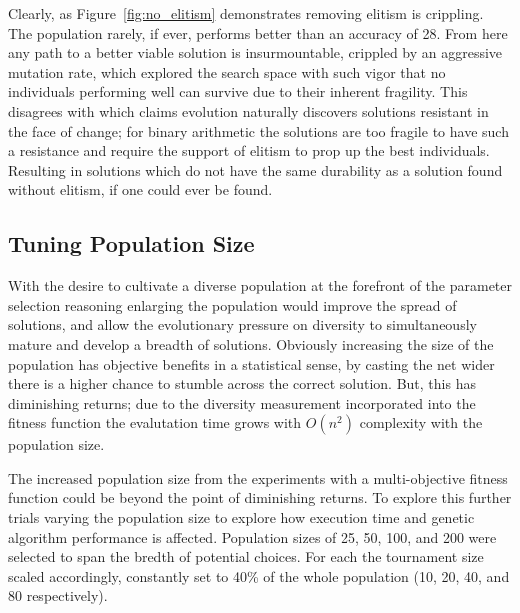 Clearly, as Figure~\ref{fig:no_elitism} demonstrates removing elitism is crippling.
The population rarely, if ever, performs better than an accuracy of 28. From here
any path to a better viable solution is insurmountable, crippled by an aggressive
mutation rate, which explored the search space with such vigor that no individuals
performing well can survive due to their inherent fragility. This disagrees with
\cite{651463} which claims evolution naturally discovers
solutions resistant in the face of change; for binary arithmetic the solutions are
too fragile to have such a resistance and require the support of elitism to prop
up the best individuals. Resulting in solutions which do not have the same durability
as a solution found without elitism, if one could ever be found.

\subsection{Tuning Population Size \label{ss:pop_size}}

With the desire to cultivate a diverse population at the forefront of the parameter
selection reasoning enlarging the population would improve the spread of solutions,
and allow the evolutionary pressure on diversity to simultaneously mature and
develop a breadth of solutions.
Obviously increasing the size of the population has objective benefits in a statistical
sense, by casting the net wider there is a higher chance to stumble
across the correct solution.
But, this has diminishing returns; due to the diversity measurement incorporated into
the fitness function the evalutation time grows with $O(n^2)$ complexity with the
population size.

The increased population size from the experiments with a multi-objective
fitness function could be beyond the point of diminishing returns. To explore this
further trials varying the population size to explore how execution time and
genetic algorithm performance is affected. Population sizes of 25, 50, 100, and 200
were selected to span the bredth of potential choices. For each the tournament size
scaled accordingly, constantly set to 40\% of the whole population (10, 20, 40, and
80 respectively).

